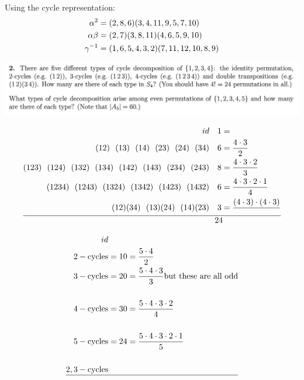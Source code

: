 \documentclass[12pt]{article}
\begin{document}
Using the cycle representation:
\begin{align*}
  \alpha^2    &= (2,8,6)(3,4,11,9,5,7,10)\\
  \alpha\beta &= (2,7)(3,8,11)(4,6,5,9,10)\\
  \gamma^{-1}   &= (1,6,5,4,3,2)(7,11,12,10,8,9)\\
\end{align*}

\newpage
\begin{mdframed}
\includegraphics[width=400pt]{img/oxford-prelims-M1-groups-2-2.png}
\end{mdframed}
\begin{align*}
  id                                                                   & ~~~ 1 = \\
  (12) ~~ (13) ~~ (14) ~~ (23) ~~ (24) ~~ (34)                         & ~~~ 6 = \frac{4 \cdot 3}{2}\\
  (123) ~~ (124) ~~ (132) ~~ (134) ~~ (142) ~~ (143) ~~ (234) ~~ (243) & ~~~ 8 = \frac{4 \cdot 3 \cdot 2}{3}\\
  (1234) ~~ (1243) ~~ (1324) ~~ (1342) ~~ (1423) ~~ (1432)             & ~~~ 6 = \frac{4 \cdot 3 \cdot 2 \cdot 1}{4}\\
  (12)(34) ~~ (13)(24) ~~ (14)(23)                                     & ~~~ 3 = \frac{(4 \cdot 3) \cdot (4 \cdot 3)}{}\\
  \hline
                                                                       & ~~ 24
\end{align*}

\begin{align*}
  id & ~~~\\
  2-\text{cycles} &= 10 = \frac{5 \cdot 4}{2}\\
  3-\text{cycles} &= 20 = \frac{5 \cdot 4 \cdot 3}{3} \text{but these are all odd}\\\\
  4-\text{cycles} &= 30 = \frac{5 \cdot 4 \cdot 3 \cdot 2}{4}\\\\
  5-\text{cycles} &= 24 = \frac{5 \cdot 4 \cdot 3 \cdot 2 \cdot 1}{5}\\\\
  2,3-\text{cycles}\\
  \hline
\end{align*}
\end{document}
